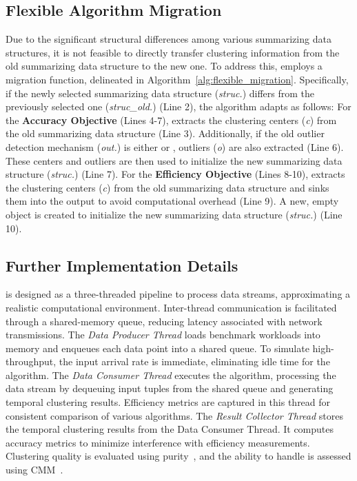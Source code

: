 \subsection{Flexible Algorithm Migration}
\label{subsec:migration}
Due to the significant structural differences among various summarizing data structures, it is not feasible to directly transfer clustering information from the old summarizing data structure to the new one. To address this, \algo employs a migration function, delineated in Algorithm~\ref{alg:flexible_migration}. 
Specifically, if the newly selected summarizing data structure (\textit{struc.}) differs from the previously selected one (\textit{struc\_old.}) (Line 2), the algorithm adapts as follows:
For the \textbf{Accuracy Objective} (Lines 4-7), \algo extracts the clustering centers (\textit{c}) from the old summarizing data structure (Line 3). Additionally, if the old outlier detection mechanism (\textit{out.}) is either \buffer or \buffertimer, outliers (\textit{o}) are also extracted (Line 6). These centers and outliers are then used to initialize the new summarizing data structure (\textit{struc.}) (Line 7).
For the \textbf{Efficiency Objective} (Lines 8-10), \algo extracts the clustering centers (\textit{c}) from the old summarizing data structure and sinks them into the output to avoid computational overhead (Line 9). A new, empty object is created to initialize the new summarizing data structure (\textit{struc.}) (Line 10).


\subsection{Further Implementation Details} 
\algo is designed as a three-threaded pipeline to process data streams, approximating a realistic computational environment. Inter-thread communication is facilitated through a shared-memory queue, reducing latency associated with network transmissions. The \emph{Data Producer Thread} loads benchmark workloads into memory and enqueues each data point into a shared queue. To simulate high-throughput, the input arrival rate is immediate, eliminating idle time for the algorithm. The \emph{Data Consumer Thread} executes the \dsc algorithm, processing the data stream by dequeuing input tuples from the shared queue and generating temporal clustering results. Efficiency metrics are captured in this thread for consistent comparison of various \dsc algorithms. The \emph{Result Collector Thread} stores the temporal clustering results from the Data Consumer Thread. It computes accuracy metrics to minimize interference with efficiency measurements. Clustering quality is evaluated using purity~\cite{10.1145/1557019.1557115}, and the ability to handle \cef is assessed using CMM~\cite{CMM:2011}.